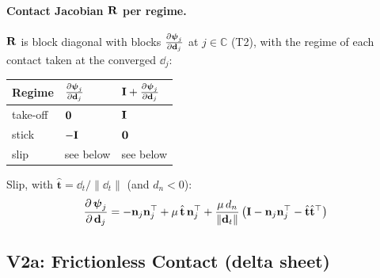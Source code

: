 \paragraph{Contact Jacobian $\mathbf{R}$ per regime.}\mbox{}
\newline $\mathbf{R}$ is block diagonal with blocks $\frac{\partial \boldsymbol{\psi}_j}{\partial \mathbf{d}_j}$ at $j \in \mathbb{C}$ (T2), with the regime of each contact taken at the converged $\dd_j$:
\begin{center}
\renewcommand{\arraystretch}{1.6}
\begin{tabular}{lll}
\textbf{Regime} & $\frac{\partial \boldsymbol{\psi}_j}{\partial \mathbf{d}_j}$ & $\mathbf{I} + \frac{\partial \boldsymbol{\psi}_j}{\partial \mathbf{d}_j}$ \\ \hline
take-off & $\mathbf{0}$ & $\mathbf{I}$ \\
stick    & $-\mathbf{I}$   & $\mathbf{0}$ \\
slip     & see below & see below \\
\end{tabular}
\end{center}
\noindent Slip, with $\hat{\mathbf{t}} = \dd_t/\left\|\dd_t\right\|$ (and $d_n < 0$):
\begin{equation*}
    \dfrac{\partial\, \boldsymbol{\psi}_j}{\partial\, \mathbf{d}_j} = -\mathbf{n}_j\mathbf{n}_j^\top + \mu\,\hat{\mathbf{t}}\,\mathbf{n}_j^\top + \frac{\mu\,d_n}{\left\|\mathbf{d}_t\right\|}\left(\mathbf{I} - \mathbf{n}_j\mathbf{n}_j^\top - \hat{\mathbf{t}}\hat{\mathbf{t}}^\top\right)
\end{equation*}


\subsection{V2a: Frictionless Contact (delta sheet)}
\label{sec:npd_v2a}

